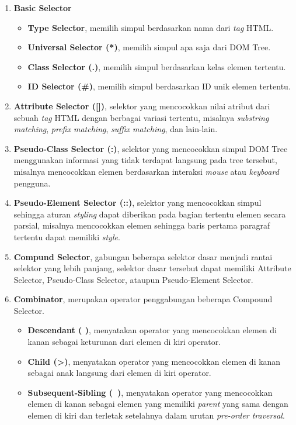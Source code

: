 \documentclass[12pt,a4paper]{article}
\begin{document}
\begin{enumerate}
    \item \textbf{Basic Selector}
    \begin{itemize}
        \item \textbf{Type Selector}, memilih simpul berdasarkan nama dari \textit{tag} HTML.
        \item \textbf{Universal Selector (*)}, memilih simpul apa saja dari DOM Tree.
        \item \textbf{Class Selector (.)}, memilih simpul berdasarkan kelas elemen tertentu.
        \item \textbf{ID Selector (#)}, memilih simpul berdasarkan ID unik elemen tertentu.
    \end{itemize}
    \item \textbf{Attribute Selector ([])}, selektor yang mencocokkan nilai atribut dari sebuah \textit{tag} HTML dengan berbagai variasi tertentu, misalnya \textit{substring matching}, \textit{prefix matching}, \textit{suffix matching}, dan lain-lain.
    \item \textbf{Pseudo-Class Selector (:)}, selektor yang mencocokkan simpul DOM Tree menggunakan informasi yang tidak terdapat langsung pada tree tersebut, misalnya mencocokkan elemen berdasarkan interaksi \textit{mouse} atau \textit{keyboard} pengguna.
    \item \textbf{Pseudo-Element Selector (::)}, selektor yang mencocokkan simpul sehingga aturan \textit{styling} dapat diberikan pada bagian tertentu elemen secara parsial, misalnya mencocokkan elemen sehingga baris pertama paragraf tertentu dapat memiliki \textit{style}.
    \item \textbf{Compund Selector}, gabungan beberapa selektor dasar menjadi rantai selektor yang lebih panjang, selektor dasar tersebut dapat memiliki Attribute Selector, Pseudo-Class Selector, ataupun Pseudo-Element Selector.
    \item \textbf{Combinator}, merupakan operator penggabungan beberapa Compound Selector.
    \begin{itemize}
        \item \textbf{Descendant ( )}, menyatakan operator yang mencocokkan elemen di kanan sebagai keturunan dari elemen di kiri operator.
        \item \textbf{Child (>)}, menyatakan operator yang mencocokkan elemen di kanan sebagai anak langsung dari elemen di kiri operator.
        \item \textbf{Subsequent-Sibling (~)}, menyatakan operator yang mencocokkan elemen di kanan sebagai elemen yang memiliki \textit{parent} yang sama dengan elemen di kiri dan terletak setelahnya dalam urutan \textit{pre-order traversal}.

\end{itemize}
\end{enumerate}
\end{document}

